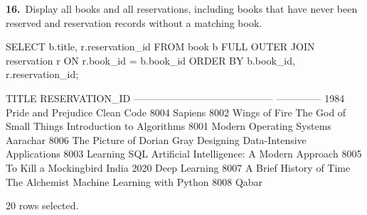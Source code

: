 \noindent\begin{minipage}{\linewidth}
\begingroup{}
{\fontsize{14}{17}\selectfont\textbf{16.}}\ Display all books and all reservations, including books that have never been reserved and reservation records without a matching book.\par
\endgroup\vspace{12pt}


\begin{sqlcode}
SELECT b.title, r.reservation_id
FROM book b
FULL OUTER JOIN reservation r ON r.book_id = b.book_id
ORDER BY b.book_id, r.reservation_id;
\end{sqlcode}

\vspace{18pt}


\begin{sqlout}[fontsize=\small]
TITLE                                       RESERVATION_ID
------------------------------------------  --------------
1984
Pride and Prejudice
Clean Code                                            8004
Sapiens                                               8002
Wings of Fire
The God of Small Things
Introduction to Algorithms                            8001
Modern Operating Systems
Aarachar                                              8006
The Picture of Dorian Gray
Designing Data-Intensive Applications                 8003
Learning SQL
Artificial Intelligence: A Modern Approach            8005
To Kill a Mockingbird
India 2020
Deep Learning                                         8007
A Brief History of Time
The Alchemist
Machine Learning with Python                          8008
Qabar

20 rows selected.
\end{sqlout}
\end{minipage}\par\vspace{24pt}

